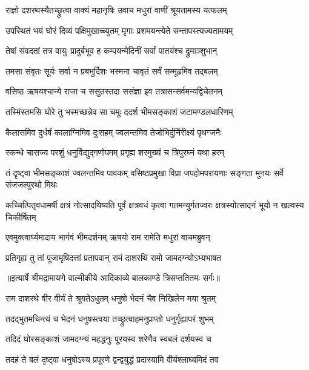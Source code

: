 \twolineshloka
{राज्ञो दशरथस्यैतच्छ्रुत्वा वाक्यं महानृषिः}
{उवाच मधुरां वाणीं श्रूयतामस्य यत्फलम्} %

\twolineshloka
{उपस्थितं भयं घोरं दिव्यं पक्षिमुखाच्च्युतम्}
{मृगाः प्रशमयन्त्येते सन्तापस्त्यज्यतामयम्} %

\twolineshloka
{तेषां संवदतां तत्र वायुः प्रादुर्बभूव ह}
{कम्पयन्मेदिनीं सर्वां पातयंश्च द्रुमाञ्शुभान्} %

\twolineshloka
{तमसा संवृतः सूर्यः सर्वा न प्रबभुर्दिशः}
{भस्मना चावृतं सर्वं सम्मूढमिव तद्बलम्} %

\twolineshloka
{वसिष्ठ ऋषयश्चान्ये राजा च ससुतस्तदा}
{ससंज्ञा इव तत्रासन्सर्वमन्यद्विचेतनम्} %

\twolineshloka
{तस्मिंस्तमसि घोरे तु भस्मच्छन्नेव सा चमूः}
{ददर्श भीमसङ्काशं जटामण्डलधारिणम्} %

\twolineshloka
{कैलासमिव दुर्धर्षं कालाग्निमिव दुःसहम्}
{ज्वलन्तमिव तेजोभिर्दुर्निरीक्ष्यं पृथग्जनैः} %

\twolineshloka
{स्कन्धे चासज्य परशुं धनुर्विद्युद्गणोपमम्}
{प्रगृह्य शरमुख्यं च त्रिपुरघ्नं यथा हरम्} %

\threelineshloka
{तं दृष्ट्वा भीमसङ्काशं ज्वलन्तमिव पावकम्}
{वसिष्ठप्रमुखा विप्रा जपहोमपरायणाः}
{सङ्गता मुनयः सर्वे संजजल्पुरथो मिथः} %

\threelineshloka
{कच्चित्पितृवधामर्षी क्षत्रं नोत्सादयिष्यति}
{पूर्वं क्षत्रवधं कृत्वा गतमन्युर्गतज्वरः}
{क्षत्रस्योत्सादनं भूयो न खल्वस्य चिकीर्षितम्} %

\twolineshloka
{एवमुक्त्वार्घ्यमादाय भार्गवं भीमदर्शनम्}
{ऋषयो राम रामेति मधुरां वाचमब्रुवन्} %

\twolineshloka
{प्रतिगृह्य तु तां पूजामृषिदत्तां प्रतापवान्}
{रामं दाशरथिं रामो जामदग्न्योऽभ्यभाषत} %


{॥इत्यार्षे श्रीमद्रामायणे वाल्मीकीये आदिकाव्ये बालकाण्डे त्रिसप्ततितमः सर्गः॥}


\twolineshloka
{राम दाशरथे वीर वीर्यं ते श्रूयतेऽधुतम्}
{धनुषो भेदनं चैव निखिलेन मया श्रुतम्} %

\twolineshloka
{तदद्भुतमचिन्त्यं च भेदनं धनुषस्त्वया}
{तच्छ्रुत्वाहमनुप्राप्तो धनुर्गृह्यापरं शुभम्} %

\twolineshloka
{तदिदं घोरसङ्काशं जामदग्न्यं महद्धनुः}
{पूरयस्व शरेणैव स्वबलं दर्शयस्व च} %

\twolineshloka
{तदहं ते बलं दृष्ट्वा धनुषोऽस्य प्रपूरणे}
{द्वन्द्वयुद्धं प्रदास्यामि वीर्यश्लाघ्यमिदं तव} %

